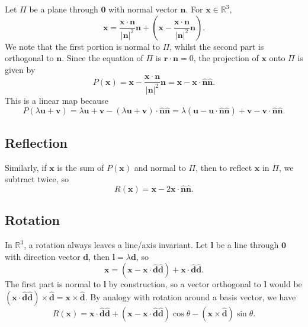 \documentclass[letter-paper]{tufte-book}
\newcommand{\db}{\boldsymbol{d}}
\newcommand{\lb}{\boldsymbol{l}}
\newcommand{\nb}{\boldsymbol{n}}
\newcommand{\ub}{\boldsymbol{u}}
\newcommand{\vb}{\boldsymbol{v}}
\newcommand{\xb}{\boldsymbol{x}}
\begin{document}
Let $\Pi$ be a plane through $\boldsymbol{0}$ with normal vector $\nb$. For
$\xb\in\mathbb{R}^3$,
\begin{equation*}
	\xb=\frac{\xb\cdot\nb}{|\nb|^2}\nb
	+\left(\xb-\frac{\xb\cdot\nb}{|\nb|^2}\nb\right).
\end{equation*}
We note that the first portion is normal to $\Pi$, whilst the second part is
orthogonal to $\nb$. Since the equation of $\Pi$ is $\boldsymbol{r}\cdot\nb=0$,
the projection of $\xb$ onto $\Pi$ is given by
\begin{equation*}
	P(\xb)=\xb-\frac{\xb\cdot\nb}{|\nb|^2}\nb=\xb-\xb\cdot\hat{\nb}\hat{\nb}.
\end{equation*}
This is a linear map because
\begin{equation*}
	P(\lambda\ub+\vb)=\lambda\ub+\vb-(\lambda\ub+\vb)\cdot\hat{\nb}\hat{\nb}
	=\lambda(\ub-\ub\cdot\hat{\nb}\hat{\nb})+\vb-\vb\cdot\hat{\nb}\hat{\nb}.
\end{equation*}

\subsection{Reflection}

Similarly, if $\xb$ is the sum of $P(\xb)$ and normal to $\Pi$, then to reflect
$\xb$ in $\Pi$, we subtract twice, so
\begin{equation*}
	R(\xb)=\xb-2\xb\cdot\hat{\nb}\hat{\nb}.
\end{equation*}

\subsection{Rotation}

In $\mathbb{R}^3$, a rotation always leaves a line/axis invariant. Let $\lb$ be
a line through $\boldsymbol{0}$ with direction vector $\db$, then
$\lb=\lambda\db$, so
\begin{equation*}
	\xb=(\xb-\xb\cdot\hat{\db}\hat{\db})+\xb\cdot\hat{\db}\hat{\db}.
\end{equation*}
The first part is normal to $\lb$ by construction, so a vector orthogonal to
$\lb$ would be $(\xb\cdot\hat{\db}\hat{\db})\times\hat{\db}=\xb\times\hat{\db}$.
By analogy with rotation around a basis vector, we have
\begin{equation*}
	R(\xb)=\xb\cdot\hat{\db}\hat{\db}+(\xb-\xb\cdot\hat{\db}\hat{\db})\cos\theta
	-(\xb\times\hat{\db})\sin\theta.
\end{equation*}
\end{document}
